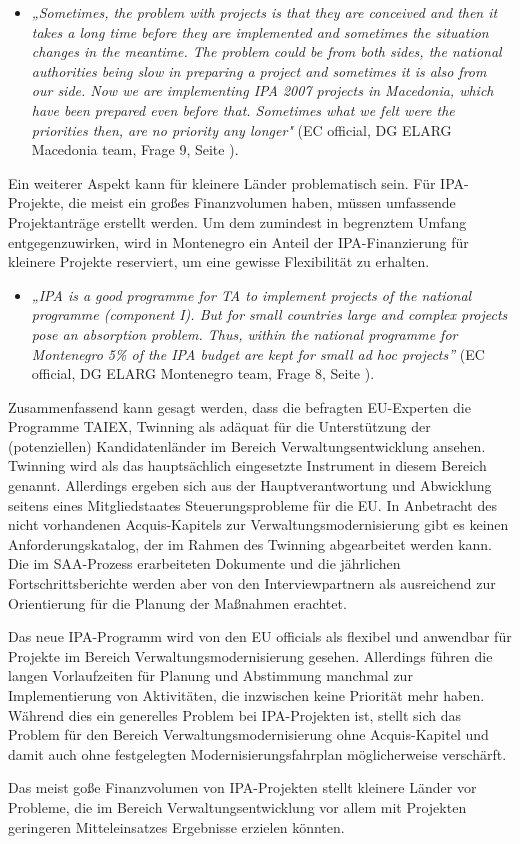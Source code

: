 \begin{itemize}[label={}]
\item \textit{„Sometimes, the problem with projects is that they are conceived and then it takes a long time before they are implemented and sometimes the situation changes in the meantime. The problem could be from both sides, the national authorities being slow in preparing a project and sometimes it is also from our side. Now we are implementing IPA 2007 projects in Macedonia, which have been prepared even before that. Sometimes what we felt were the priorities then, are no priority any longer"} (EC official, DG ELARG Macedonia team, Frage 9, Seite \pageref{sec:technical}).
\end{itemize}
Ein weiterer Aspekt kann für kleinere Länder problematisch sein. Für IPA-Projekte, die meist ein großes Finanzvolumen haben, müssen umfassende Projektanträge erstellt werden. Um dem zumindest in begrenztem Umfang entgegenzuwirken, wird in Montenegro ein Anteil der IPA-Finanzierung für kleinere Projekte reserviert, um eine gewisse Flexibilität zu erhalten.
\begin{itemize}[label={}]
\item \textit{„IPA is a good programme for TA to implement projects of the national programme (component I). But for small countries large and complex projects pose an absorption problem. Thus, within the national programme for Montenegro 5\% of the IPA budget are kept for small ad hoc projects”} (EC official, DG ELARG Montenegro team, Frage 8, Seite \pageref{sec:relevant}).
\end{itemize}
Zusammenfassend kann gesagt werden, dass die befragten EU-Experten die Programme TAIEX, Twinning als adäquat für die Unterstützung der (potenziellen) Kandidatenländer im Bereich Verwaltungsentwicklung ansehen. Twinning wird als das hauptsächlich eingesetzte Instrument in diesem Bereich genannt. Allerdings ergeben sich aus der Hauptverantwortung und Abwicklung seitens eines Mitgliedstaates Steuerungsprobleme für die EU. In Anbetracht des nicht vorhandenen Acquis-Kapitels zur Verwaltungsmodernisierung gibt es keinen Anforderungskatalog, der im Rahmen des Twinning abgearbeitet werden kann. Die im SAA-Prozess erarbeiteten Dokumente und die jährlichen Fortschrittsberichte werden aber von den Interviewpartnern als ausreichend zur Orientierung für die Planung der Maßnahmen erachtet.\par
Das neue IPA-Programm wird von den EU officials als flexibel und anwendbar für Projekte im Bereich Verwaltungsmodernisierung gesehen. Allerdings führen die langen Vorlaufzeiten für Planung und Abstimmung manchmal zur Implementierung von Aktivitäten, die inzwischen keine Priorität mehr haben. Während dies ein generelles Problem bei IPA-Projekten ist, stellt sich das Problem für den Bereich Verwaltungsmodernisierung ohne Acquis-Kapitel und damit auch ohne festgelegten Modernisierungsfahrplan möglicherweise verschärft.\par
Das meist goße Finanzvolumen von IPA-Projekten stellt kleinere Länder vor Probleme, die im Bereich Verwaltungsentwicklung vor allem mit Projekten geringeren Mitteleinsatzes Ergebnisse erzielen könnten.

